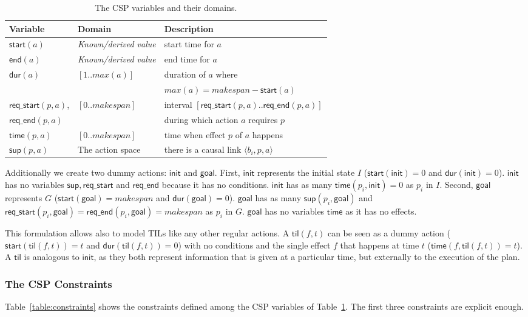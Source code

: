 \documentclass{ecai}
\newcommand{\tup}[1]{{\langle #1 \rangle}}
\newcommand{\dur}{\mathsf{dur}}    %
\newcommand{\start}{\mathsf{start}}%
\newcommand{\en}{\mathsf{end}}     %
\newcommand{\til}{\mathsf{til}}    %
\newcommand{\supp}{\mathsf{sup}}   %
\newcommand{\tim}{\mathsf{time}}   %
\newcommand{\reqs}{\mathsf{req\_{start}}} %
\newcommand{\reqe}{\mathsf{req\_{end}}}   %
\newcommand{\ini}{\mathsf{init}}   %
\newcommand{\goal}{\mathsf{goal}}  %
\begin{document}
\begin{table}
\setlength\extrarowheight{2pt}  
\begin{scriptsize}
\begin{tabular}{lll}
{\bf Variable} & {\bf Domain} & {\bf Description} \\\hline
$\start(a)$ & \emph{Known/derived value} & start time for $a$  \\
$\en(a)$ & \emph{Known/derived value} & end time for $a$ \\
$\dur(a)$ & $[1..max(a)]$ & duration of $a$ where \\
&&$max(a)=makespan-\start(a)$\\

$\reqs(p,a)$, & $[0..makespan]$ & interval $[\reqs(p,a)..\reqe(p,a)]$ \\ 
$\reqe(p,a)$ && during which action $a$ requires $p$ \\

$\tim(p,a)$ & $[0..makespan]$ & time when effect $p$ of $a$ happens \\

$\supp(p,a)$ & The action space & there is a causal link $\tup{b_i,p,a}$ 
\end{tabular}
\end{scriptsize}
\caption{\small The CSP variables and their domains.}
\label{table:variables}
\end{table}

Additionally we create two dummy actions: $\ini$ and $\goal$. First, $\ini$ represents the initial state $I$ ($\start(\ini)=0$ and $\dur(\ini)=0$). $\ini$ has no variables $\supp, \reqs$ and $\reqe$ because it has no conditions. $\ini$ has as many $\tim(p_i,\ini)=0$ as $p_i$ in $I$. Second, $\goal$ represents $G$ ($\start(\goal)=makespan$ and $\dur(\goal)=0$). $\goal$ has as many $\supp(p_i,\goal)$ and $\reqs(p_i,\goal)=\reqe(p_i,\goal)=makespan$ as $p_i$ in $G$. $\goal$ has no variables $\tim$ as it has no effects.

This formulation allows also to model TILs like any other regular actions. A $\til(f,t)$ can be seen as a dummy action ($\start(\til(f,t))=t$ and $\dur(\til(f,t))=0$) with no conditions and the single effect $f$ that happens at time $t$ ($\tim(f,\til(f,t))=t$). A $\til$ is analogous to $\ini$, as they both represent information that is given at a particular time, but externally to the execution of the plan. 

\subsubsection{The CSP Constraints}
Table~\ref{table:constraints} shows the constraints defined among the CSP variables of Table~\ref{table:variables}. The first three constraints are explicit enough.
\end{document}
